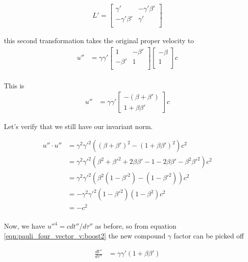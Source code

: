 \begin{align*}
L' =
\begin{bmatrix}
\gamma' & - \gamma' \beta' \\
- \gamma' \beta' & \gamma' \\
\end{bmatrix}
\end{align*}

this second transformation takes the original proper velocity to
\begin{align*}
u'' &=
\gamma \gamma'
\begin{bmatrix}
1 & - \beta' \\
- \beta' & 1 \\
\end{bmatrix}
\begin{bmatrix}
- \beta \\
1 \\
\end{bmatrix}
c \\
\end{align*}

This is
\begin{align}\label{eqn:pauli_four_vector_v:boost2}
u'' &=
\gamma \gamma'
\begin{bmatrix}
-(\beta + \beta') \\
1 + \beta\beta'
\end{bmatrix}
c
\end{align}

Let's verify that we still have our invariant norm.

\begin{align*}
u'' \cdot u'' 
&=
\gamma^2 {\gamma'}^2
\left(
(\beta + \beta')^2 
-(1 + \beta\beta')^2
\right)
c^2 \\
&=
\gamma^2 {\gamma'}^2
\left(
\beta^2
+{\beta'}^2
+2 \beta\beta'
-1
-2 \beta\beta'
-\beta^2 {\beta'}^2
\right)
c^2 \\
&=
\gamma^2 {\gamma'}^2
\left(
\beta^2 (1 - {\beta'}^2)
-(1 -{\beta'}^2)
\right)
c^2 \\
&=
-\gamma^2 {\gamma'}^2 (1 -{\beta'}^2)(1 -\beta^2) c^2 \\
&=
- c^2 \\
\end{align*}

Now, we have ${u''}^4 = c dt''/d\tau''$ as before, so from equation
\ref{eqn:pauli_four_vector_v:boost2} the new compound $\gamma$ factor can be picked off

\begin{align*}
\frac{dt''}{d\tau''} &=
\gamma \gamma'( 1 + \beta\beta' )
\end{align*}

